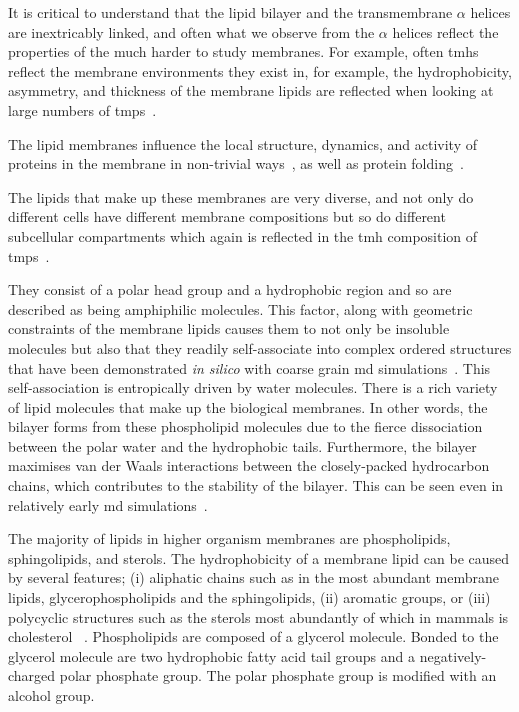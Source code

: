 It is critical to understand that the lipid bilayer and the transmembrane $\alpha$ helices are inextricably linked, and often what we observe from the $\alpha$ helices reflect the properties of the much harder to study membranes.
For example, often \gls{tmh}s reflect the membrane environments they exist in, for example, the hydrophobicity, asymmetry, and thickness of the membrane lipids are reflected when looking at large numbers of \gls{tmp}s~\cite{Sharpe2010}.

The lipid membranes influence the local structure, dynamics, and activity of proteins in the membrane in non-trivial ways~\cite{Bondar2010, Bondar2009, Jardon-Valadez2010, Kalvodova2005, Urban2005, White2001a, Jensen2004, Henin2014}, as well as protein folding~\cite{Kauko2010}.


The lipids that make up these membranes are very diverse, and not only do different cells have different membrane compositions but so do different subcellular compartments which again is reflected in the \gls{tmh} composition of \gls{tmp}s~\cite{Sharpe2010, VanMeer2008}.

They consist of a polar head group and a hydrophobic region and so are described as being amphiphilic molecules.
This factor, along with geometric constraints of the membrane lipids causes them to not only be insoluble molecules but also that they readily self-associate into complex ordered structures that have been demonstrated \textit{in silico} with coarse grain \gls{md} simulations~\cite{Scott2008}.
This self\--association is entropically driven by water molecules.
There is a rich variety of lipid molecules that make up the biological membranes.
In other words, the bilayer forms from these phospholipid molecules due to the fierce dissociation between the polar water and the hydrophobic tails.
Furthermore, the bilayer maximises van der Waals interactions between the closely-packed hydrocarbon chains, which contributes to the stability of the bilayer.
This can be seen even in relatively early \gls{md} simulations~\cite{Goetz1998}.

The majority of lipids in higher organism membranes are phospholipids, sphingolipids, and sterols.
The hydrophobicity of a membrane lipid can be caused by several features; (i) aliphatic chains such as in the most abundant membrane lipids, glycerophospholipids and the sphingolipids, (ii) aromatic groups, or (iii) polycyclic structures such as the sterols most abundantly of which in mammals is cholesterol ~\cite{Helenius1975, Lichtenberg1983}.
Phospholipids are composed of a glycerol molecule.
Bonded to the glycerol molecule are two hydrophobic fatty acid tail groups and a negatively-charged polar phosphate group.
The polar phosphate group is modified with an alcohol group.

